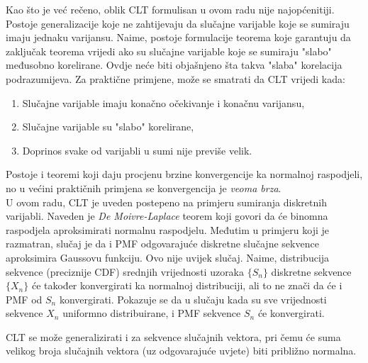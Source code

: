 Kao što je već rečeno, oblik CLT formulisan u ovom radu nije najopćenitiji.
Postoje generalizacije koje ne zahtijevaju da slučajne varijable koje se
sumiraju imaju jednaku varijansu. Naime, postoje formulacije teorema koje
garantuju da zaključak teorema vrijedi ako su slučajne varijable koje se
sumiraju "slabo" međusobno korelirane. Ovdje neće biti objašnjeno šta takva
"slaba" korelacija podrazumijeva.
%
Za praktične primjene, može se smatrati da CLT vrijedi kada:

\begin{enumerate}
  \item Slučajne varijable imaju konačno očekivanje i konačnu varijansu,
  \item Slučajne varijable su "slabo" korelirane,
  \item Doprinos svake od varijabli u sumi nije previše velik.
\end{enumerate}

Postoje i teoremi koji daju procjenu brzine konvergencije ka normalnoj
raspodjeli, no u većini praktičnih primjena se konvergencija je \textit{veoma
brza}. \\

U ovom radu, CLT je uveden postepeno na primjeru sumiranja diskretnih varijabli.
Naveden je \textit{De Moivre-Laplace} teorem koji govori da će binomna
raspodjela aproksimirati normalnu raspodjelu. Međutim u primjeru koji je
razmatran, slučaj je da i PMF odgovarajuće diskretne slučajne sekvence
aproksimira Gaussovu funkciju. Ovo nije uvijek slučaj. Naime, distribucija
sekvence (preciznije CDF) srednjih vrijednosti uzoraka $\{S_n\}$ diskretne
sekvence $\{X_n\}$ će također konvergirati ka normalnoj distribuciji, ali to ne
znači da će i PMF od $S_n$ konvergirati. Pokazuje se da u slučaju kada su sve
vrijednosti sekvence $X_n$ uniformno distribuirane, i PMF sekvence $S_n$ će
konvergirati.

CLT se može generalizirati i za sekvence slučajnih vektora, pri čemu će suma
velikog broja slučajnih vektora (uz odgovarajuće uvjete) biti približno
normalna.

